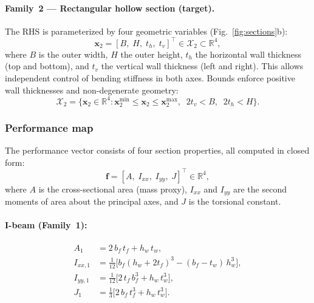 \paragraph{Family~2 --- Rectangular hollow section (target).}
The RHS is parameterized by four geometric variables (Fig.~\ref{fig:sections}b):
\begin{equation}
    \mathbf{x}_2 = [B,\; H,\; t_h,\; t_v]^\top \in \mathcal{X}_2 \subset \mathbb{R}^4,
    \label{eq:rhs_params}
\end{equation}
where $B$ is the outer width, $H$ the outer height, $t_h$ the horizontal wall thickness (top and bottom), and $t_v$ the vertical wall thickness (left and right). This allows independent control of bending stiffness in both axes. Bounds enforce positive wall thicknesses and non-degenerate geometry:
\begin{equation}
    \mathcal{X}_2 = \bigl\{ \mathbf{x}_2 \in \mathbb{R}^4 : \mathbf{x}_2^{\min} \leq \mathbf{x}_2 \leq \mathbf{x}_2^{\max},\;\; 2t_v < B,\;\; 2t_h < H \bigr\}.
\end{equation}


\subsubsection{Performance map}

The performance vector consists of four section properties, all computed in closed form:
\begin{equation}
    \mathbf{f} = [A,\; I_{xx},\; I_{yy},\; J]^\top \in \mathbb{R}^4,
    \label{eq:section_perf}
\end{equation}
where $A$ is the cross-sectional area (mass proxy), $I_{xx}$ and $I_{yy}$ are the second moments of area about the principal axes, and $J$ is the torsional constant.

\paragraph{I-beam (Family~1):}
\begin{subequations}
\label{eq:ibeam_properties}
\begin{align}
    A_1 &= 2\, b_f\, t_f + h_w\, t_w, \\
    I_{xx,1} &= \tfrac{1}{12}\bigl[ b_f (h_w + 2t_f)^3 - (b_f - t_w)\, h_w^3 \bigr], \\
    I_{yy,1} &= \tfrac{1}{12}\bigl[ 2\, t_f\, b_f^3 + h_w\, t_w^3 \bigr], \\
    J_1 &= \tfrac{1}{3}\bigl[ 2\, b_f\, t_f^3 + h_w\, t_w^3 \bigr].
\end{align}
\end{subequations}

